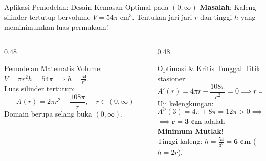 \documentclass[aspectratio=43,10pt]{beamer}
\begin{document}
\begin{frame}{Aplikasi Pemodelan: Desain Kemasan Optimal pada $(0, \infty)$}
    \textbf{Masalah}: Kaleng silinder tertutup bervolume $V = 54\pi\text{ cm}^3$. Tentukan jari-jari $r$ dan tinggi $h$ yang meminimumkan luas permukaan!

    \pause
    \vspace{0.08cm}
    \begin{columns}[T]
        \begin{column}{0.48\textwidth}
            \begin{block}{Pemodelan Matematis}
                Volume: $V = \pi r^2 h = 54\pi \implies h = \frac{54}{r^2}$.\\
                \vspace{0.04cm}
                Luas silinder tertutup:
                \[
                    A(r) = 2\pi r^2 + \frac{108\pi}{r}, \quad r \in (0, \infty)
                \]
                {\scriptsize Domain berupa selang buka $(0, \infty)$.}
            \end{block}
        \end{column}

        \begin{column}{0.48\textwidth}
            \begin{exampleblock}{Optimasi \& Kritis Tunggal}
                Titik stasioner:
                \[
                    A'(r) = 4\pi r - \frac{108\pi}{r^2} = 0 \implies r = 3
                \]
                Uji kelengkungan:
                \[
                    A''(3) = 4\pi + 8\pi = 12\pi > 0 \implies \cup
                \]
                $\implies \mathbf{r = 3\text{ cm}}$ adalah \textbf{Minimum Mutlak}!\\
                Tinggi kaleng: $h = \frac{54}{3^2} = \mathbf{6\text{ cm}}$ ($h = 2r$).
            \end{exampleblock}
        \end{column}
    \end{columns}
\end{frame}
\end{document}
